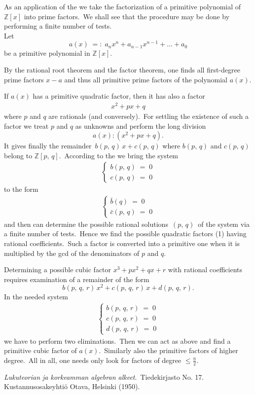 \documentclass[12pt]{article}
\theoremstyle{definition}
\begin{document}
As an application of the  we take the factorization of a primitive polynomial of $\mathbb{Z}[x]$ into  prime factors.\, We shall see that the procedure may be done by performing a finite number of tests.\\

Let
$$a(x) \;=:\; a_nx^n\!+\!a_{n-1}x^{n-1}\!+\ldots+\!a_0$$
be a primitive polynomial in $\mathbb{Z}[x]$.

By the rational root theorem and the factor theorem, one finds all first-degree prime factors $x\!-\!a$ and thus all primitive prime factors of the polynomial $a(x)$.

If $a(x)$ has a primitive quadratic factor, then it has also a factor
\begin{align}
x^2\!+\!px\!+\!q
\end{align}
where $p$ and $q$ are  rationals (and conversely).\, For settling the existence of such a factor we treat $p$ and $q$ as unknowns and perform the long division
$$a(x):(x^2\!+\!px\!+\!q).$$
It gives finally the remainder \,$b(p,\,q)\,x+c(p,\,q)$ where $b(p,\,q)$ and $c(p,\,q)$ belong to $\mathbb{Z}[p,\,q]$.\, According to the  we bring the system
\begin{align*}
\begin{cases}
b(p,\,q) \;=\; 0\\
c(p,\,q) \;=\; 0
\end{cases}
\end{align*}
to the form
\begin{align*}
\begin{cases}
\bar{b}(q) \;=\; 0\\
\bar{c}(p,\,q) \;=\; 0
\end{cases}
\end{align*}
and then can determine the possible rational solutions \,$(p,\,q)$\, of the system via a finite number of tests.\, Hence 
 we find the possible quadratic factors (1) having rational coefficients.\, Such a factor is converted into a primitive one when it is multiplied by the gcd of the denominators of $p$ and $q$.

Determining a possible cubic factor $x^3\!+\!px^2\!+\!qx\!+\!r$ with rational coefficients requires examination of a remainder of the form
$$b(p,\,q,\,r)\,x^2+c(p,\,q,\,r)\,x+d(p,\,q,\,r).$$
In the needed system
\begin{align*}
\begin{cases}
b(p,\,q,\,r) \;=\; 0\\
c(p,\,q,\,r) \;=\; 0\\
d(p,\,q,\,r) \;=\; 0
\end{cases}
\end{align*}
we have to perform two eliminations.\, Then we can act as above and find a primitive cubic factor of $a(x)$.\, Similarly also the primitive factors of higher degree.\, All in all, one needs only look for factors of degree $\le \frac{n}{2}$.

\begin{thebibliography}{9}
 {\em Lukuteorian ja korkeamman algebran alkeet}. \,Tiedekirjasto No. 17. \, Kustannusosakeyhti\"o Otava, Helsinki (1950).
\end{thebibliography}
\end{document}

